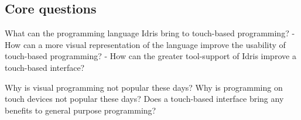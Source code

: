 \subsection{Core questions}
What can the programming language Idris bring to touch-based programming?
  - How can a more visual representation of the language improve the usability of touch-based programming?
  - How can the greater tool-support of Idris improve a touch-based interface?

Why is visual programming not popular these days?
Why is programming on touch devices not popular these days?
Does a touch-based interface bring any benefits to general purpose programming?

